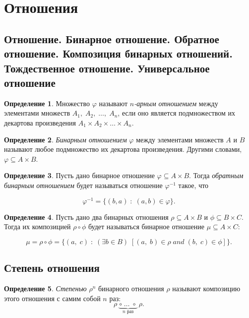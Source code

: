 \documentclass{article}
\theoremstyle{plain}
\theoremstyle{definition}
\newtheorem{definition}{Определение}[subsection]
\begin{document}
\section{Отношения}

\subsection{Отношение. Бинарное отношение. Обратное отношение. Композиция бинарных отношений. Тождественное отношение. Универсальное отношение}

\begin{definition}
	Множество \(\varphi\) называют \textit{\(n\)-арным отношением} между элементами множеств \(A_1,\; A_2,\; \ldots,\; A_n\), если оно является подмножеством их декартова произведения \(A_1 \times A_2 \times \ldots \times A_n\).
\end{definition}

\begin{definition}
	\textit{Бинарным отношением} \(\varphi\) между элементами множеств \(A\) и \(B\) называют любое подмножество их декартова произведения. Другими словами, \(\varphi \subseteq A \times B\).
\end{definition}

\begin{definition}
	Пусть дано бинарное отношение \(\varphi \subseteq A \times B\). Тогда \textit{обратным бинарным отношением} будет называться отношение \(\varphi^{-1}\) такое, что

	\[
		\varphi^{-1} = \{(b, a) \;:\; (a, b) \in \varphi\}.
	\]
\end{definition}

\begin{definition}
	Пусть дано два бинарных отношения \(\rho \subseteq A \times B\) и \(\phi \subseteq B \times C\). Тогда их композицией \(\rho \circ \phi\) будет называться бинарное отношение \(\mu \subseteq A \times C\):

	\[
		\mu = \rho \circ \phi = \{(a,\; c) \;\colon\; (\exists b \in B)\; [(a,\; b) \in \rho \;and\; (b,\; c) \in \phi]\}.
	\]
\end{definition}

\subsection{Степень отношения}

\begin{definition}
	\textit{Степенью} \(\rho^n\) бинарного отношения \(\rho\) называют композицию этого отношения с самим собой \(n\) раз: \[\rho\; \underbrace{\circ\; \ldots\; \circ}_\text{$n$ раз}\; \rho.\]
\end{definition}
\end{document}
